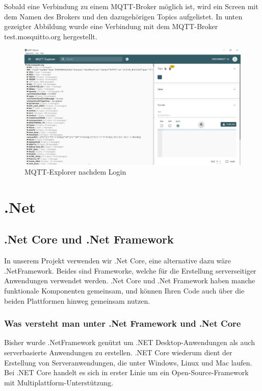  Sobald eine Verbindung zu einem MQTT-Broker möglich ist, wird ein Screen mit dem Namen des Brokers und den dazugehörigen Topics aufgelistet. 
 In unten gezeigter Abbildung wurde eine Verbindung mit dem MQTT-Broker test.mosquitto.org hergestellt.  

 \begin{figure}[H]
    \centering
    \includegraphics[width=1\textwidth]{pics/MQTTExplorerTestDemo.JPG}
    \caption{MQTT-Explorer nachdem Login}
\end{figure}








\section{.Net}



\subsection{.Net Core und .Net Framework}

In unserem Projekt verwenden wir .Net Core, eine alternative dazu wäre .NetFramework.
Beides sind Frameworke, welche für die Erstellung serverseitiger Anwendungen verwendet werden. 
.Net Core und .Net Framework haben manche funktionale Komponenten gemeinsam, und können Ihren Code auch über die beiden Plattformen hinweg gemeinsam nutzen.

\subsubsection*{ Was versteht man unter .Net Framework und .Net Core}
Bisher wurde .NetFramework genützt um .NET Desktop-Anwendungen als auch serverbasierte Anwendungen zu erstellen.
.NET Core wiederum dient der Erstellung von Serveranwendungen, die unter Windows, Linux und Mac laufen.
Bei .NET Core handelt es sich in erster Linie um ein Open-Source-Framework mit Multiplattform-Unterstützung.


